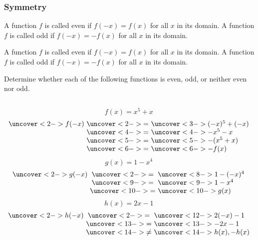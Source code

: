 \begin{frame}
\frametitle{Symmetry}
\begin{definition}
A function $f$ is called even if $f(-x) = f(x)$ for all $x$ in its domain.  A function $f$ is called odd if $f(-x) = -f(x)$ for all $x$ in its domain.
\end{definition}
\end{frame}

\begin{frame}
\begin{definition}
A function $f$ is called even if $f(-x) = f(x)$ for all $x$ in its domain.  A function $f$ is called odd if $f(-x) = -f(x)$ for all $x$ in its domain.
\end{definition}
\begin{example}[Example 11, p. 19]
Determine whether each of the following functions is even, odd, or neither even nor odd.

\begin{columns}[t]
\[
f(x) = x^5 + x
\]
\[
\begin{array}{r@{ \ }c@{ \ }l}
\uncover<2->{f(-x)} & \uncover<2->{=} & \uncover<3->{(-x)^5 + (-x)} \\
& \uncover<4->{=} & \uncover<4->{-x^5 - x} \\
& \uncover<5->{=} & \uncover<5->{-(x^5 + x)} \\
& \uncover<6->{=} & \uncover<6->{-f(x)} 
\end{array}
\]
\[
g(x) = 1 - x^4
\]
\[
\begin{array}{r@{ \ }c@{ \ }l}
\uncover<2->{g(-x)} & \uncover<2->{=} & \uncover<8->{1 - (-x)^4} \\
& \uncover<9->{=} & \uncover<9->{1 - x^4} \\
& \uncover<10->{=} & \uncover<10->{g(x)} 
\end{array}
\]
\[
h(x) = 2x - 1
\]
\[
\begin{array}{r@{ \ }c@{ \ }l}
\uncover<2->{h(-x)} & \uncover<2->{=} & \uncover<12->{2(-x) - 1} \\
& \uncover<13->{=} & \uncover<13->{-2x - 1} \\
& \uncover<14->{\neq} & \uncover<14->{h(x), -h(x)}
\end{array}
\]
\end{columns}
\end{example}
\end{frame}
